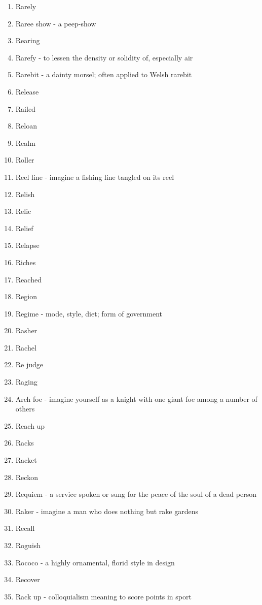 \begin{enumerate}
        \item Rarely
        \item Raree show - a peep-show
        \item Rearing
        \item Rarefy - to lessen the density or solidity of, especially air
        \item Rarebit - a dainty morsel; often applied to Welsh rarebit
        \item Release
        \item Railed
        \item Reloan
        \item Realm
        \item Roller
        \item Reel line - imagine a fishing line tangled on its reel
        \item Relish
        \item Relic
        \item Relief
        \item Relapse
        \item Riches
        \item Reached
        \item Region
        \item Regime - mode, style, diet; form of government
        \item Rasher
        \item Rachel
        \item Re judge
        \item Raging
        \item Arch foe - imagine yourself as a knight with one giant foe among a number of others
        \item Reach up
        \item Racks
        \item Racket
        \item Reckon
        \item Requiem - a service spoken or sung for the peace of the soul of a dead person
        \item Raker - imagine a man who does nothing but rake gardens
        \item Recall
        \item Roguish
        \item Rococo - a highly ornamental, florid style in design
        \item Recover
        \item Rack up - colloquialism meaning to score points in sport

\end{enumerate}
